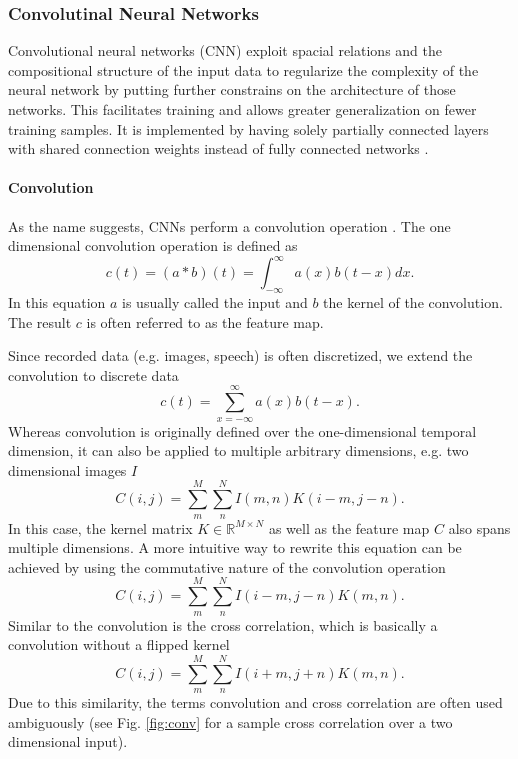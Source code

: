 \subsubsection{Convolutinal Neural Networks} \label{c:cnns}

Convolutional neural networks (CNN) exploit spacial relations and the compositional structure of the input data to regularize the complexity of the neural network by putting further constrains on the architecture of those networks.
This facilitates training and allows greater generalization on fewer training samples.
It is implemented by having solely partially connected layers with shared connection weights instead of fully connected networks \cite{lecun1989backpropagation}\cite{Goodfellow-et-al-2016-Book}.    

\paragraph{Convolution} \label{c:convolution}

As the name suggests, CNNs perform a convolution operation \cite{Goodfellow-et-al-2016-Book}. The one dimensional convolution operation is defined as
\[
c(t) = (a * b)(t) = \int_{- \infty}^{\infty} a(x)b(t-x) dx.
\]
In this equation $a$ is usually called the input and $b$ the kernel of the convolution. The result $c$ is often referred to as the feature map.

Since recorded data (e.g. images, speech) is often discretized, we extend the convolution to discrete data
\[
c(t) = \sum_{x = - \infty}^{\infty} a(x)b(t-x).
\]
Whereas convolution is originally defined over the one-dimensional temporal dimension, it can also be applied to multiple arbitrary dimensions, e.g. two dimensional images $I$
\[
C(i,j) = \sum_m^M \sum_n^N I(m,n) K(i - m, j -n).
\]
In this case, the kernel matrix $K \in \mathbb{R}^{M \times N} $ as well as the feature map $C$ also spans multiple dimensions.
A more intuitive way to rewrite this equation can be achieved by using the commutative nature of the convolution operation
\[
C(i,j) = \sum_m^M \sum_n^N I(i - m,j - n) K(m, n).
\]
Similar to the convolution is the cross correlation, which is basically a convolution without a flipped kernel
\[
C(i,j) = \sum_m^M \sum_n^N I(i + m,j + n) K(m, n).
\]
Due to this similarity, the terms convolution and cross correlation are often used ambiguously (see Fig. \ref{fig:conv} for a sample cross correlation over a two dimensional input).

